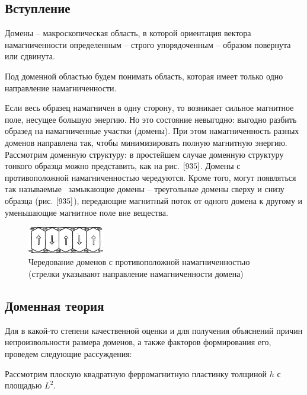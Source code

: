\documentclass[a4paper,14pt]{article} %
\begin{document}
\subsection{Вступление}

$\textbf{Домены}$ -- макроскопическая область, в которой ориентация вектора намагниченности определенным -- строго упорядоченным -- образом повернута или сдвинута.

Под доменной областью будем понимать область, которая имеет только одно направление намагниченности.

Если весь образец намагничен в одну сторону, то возникает сильное магнитное поле, несущее большую энергию. Но это состояние невыгодно: выгодно разбить образед на намагниченные участки ($\textbf{домены}$). При этом намагниченность разных доменов направлена так, чтобы минимизировать полную магнитную энергию. Рассмотрим доменную структуру: в простейшем случае доменную структуру тонкого образца можно представить, как на рис. $\ref{935}$. Домены с противоположной намагниченностью чередуются. Кроме того, могут появляться так называемые \
$\textbf{замыкающие}$ $\textbf{домены}$ -- треугольные домены сверху и снизу образца (рис. $\ref{935}$), передающие магнитный поток от одного домена к другому и уменьшающие магнитное поле вне вещества.

\begin{figure}[h!]

\begin{center}
\includegraphics[width=0.3\textwidth]{9.3.5.png} 
\end{center}
\caption{Чередование доменов с противоположной намагниченностью (стрелки указывают направление намагниченности домена)}
\label{935}

\end{figure}

\subsection{Доменная теория}

Для в какой-то степени качественной оценки и для получения объяснений причин непроизвольности размера доменов, а также факторов формирования его, проведем следующие рассуждения:

Рассмотрим плоскую квадратную ферромагнитную пластинку толщиной $h$ с площадью $L^{2} .$
\end{document}
